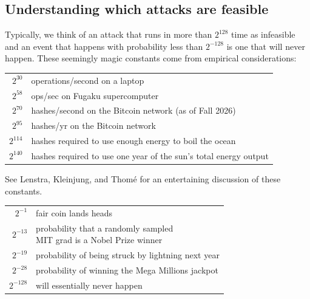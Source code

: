 \subsection{Understanding which attacks are feasible}

Typically, we think of an attack that runs in more than $2^{128}$ time
as infeasible and an event that happens with probability less than $2^{-128}$
is one that will never happen.
These seemingly magic constants come from empirical considerations:

\begin{table}[htpb]
	\centering

	\begin{tabular}{rl}
		$2^{30}$ & operations/second on a laptop \\
		$2^{58}$ & ops/sec on Fugaku supercomputer \\
		$2^{70}$ & hashes/second on the Bitcoin network (as of Fall 2026) \\
    $2^{95}$ & hashes/yr on the Bitcoin network\\
		$2^{114}$ & hashes required to use enough energy to boil the ocean \\
		$2^{140}$ & hashes required to use one year of the sun's total energy output \\
	\end{tabular}
\end{table}

See Lenstra, Kleinjung, and Thom{\'e} for an entertaining
discussion of these constants.\autocite{lenstra:universal}

\begin{table}[htpb]
	\centering

	\begin{tabular}{rl}
		$2^{-1}$ & fair coin lands heads \\
    $2^{-13}$ & \parbox{3.5in}{probability that a randomly sampled\\[-3pt] MIT grad is a Nobel Prize winner}\\
    $2^{-19}$ & probability of being struck by lightning next year\\
		$2^{-28}$ & probability of winning the Mega Millions jackpot\\
		$2^{-128}$ & will essentially never happen \\
	\end{tabular}
\end{table}


